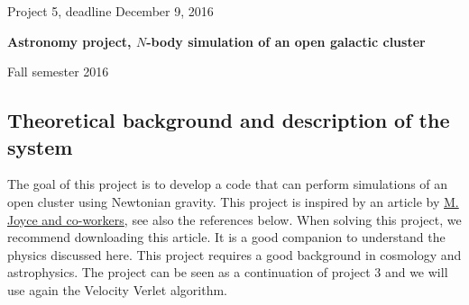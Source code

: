 \documentclass[%
oneside,                 %
final,                   %
10pt]{article}
\begin{document}

\newcommand{\exercisesection}[1]{\subsection*{#1}}






\thispagestyle{empty}

\begin{center}
{\LARGE\bf
\begin{spacing}{1.25}
Project 5, deadline  December 9, 2016
\end{spacing}
}
\end{center}


\begin{center}
{\bf Astronomy project, $N$-body simulation of an open galactic cluster${}^{}$} \\ [0mm]
\end{center}

\begin{center}
\end{center}
    

\begin{center}
Fall semester 2016
\end{center}

\vspace{1cm}


\subsection*{Theoretical background and description of the system}

The goal of this project is to develop a code that can perform
simulations of an open cluster using Newtonian gravity. 
This project is inspired by an article by
\href{{http://dx.doi.org/10.1063/1.3462740}}{M. Joyce and co-workers}, see also the references below.  When solving this
project, we recommend downloading this article. It is a good companion
to understand the physics discussed here.
This project requires a good  background in cosmology and
astrophysics. The project can be seen as a continuation of project 3 and we will use again
the Velocity Verlet algorithm. 
\end{document}
